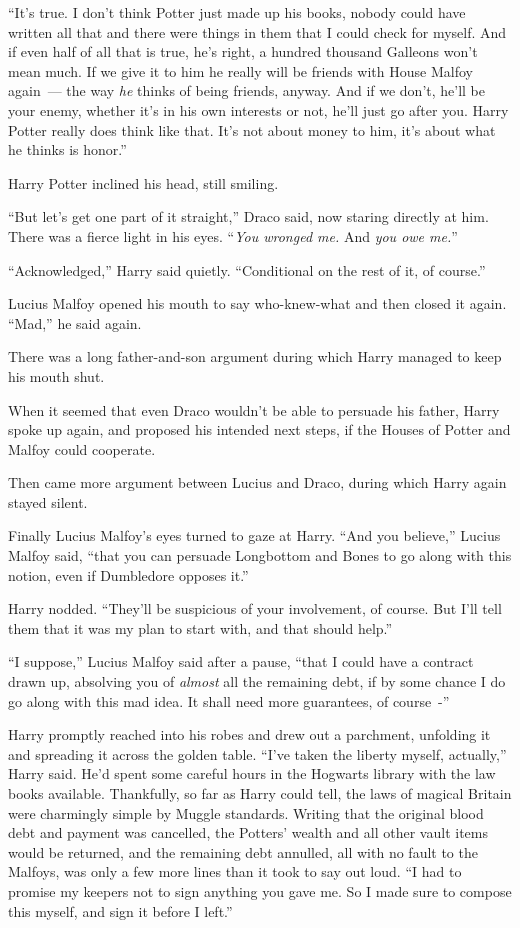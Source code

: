 ``It's true. I don't think Potter just made up his books, nobody could have written all that and there were things in them that I could check for myself. And if even half of all that is true, he's right, a hundred thousand Galleons won't mean much. If we give it to him he really will be friends with House Malfoy again~--- the way \emph{he} thinks of being friends, anyway. And if we don't, he'll be your enemy, whether it's in his own interests or not, he'll just go after you. Harry Potter really does think like that. It's not about money to him, it's about what he thinks is honor.''

Harry Potter inclined his head, still smiling.

``But let's get one part of it straight,'' Draco said, now staring directly at him. There was a fierce light in his eyes. ``\emph{You wronged me.} And \emph{you owe me.}''

``Acknowledged,'' Harry said quietly. ``Conditional on the rest of it, of course.''

Lucius Malfoy opened his mouth to say who-knew-what and then closed it again. ``Mad,'' he said again.

There was a long father-and-son argument during which Harry managed to keep his mouth shut.

When it seemed that even Draco wouldn't be able to persuade his father, Harry spoke up again, and proposed his intended next steps, if the Houses of Potter and Malfoy could cooperate.

Then came more argument between Lucius and Draco, during which Harry again stayed silent.

Finally Lucius Malfoy's eyes turned to gaze at Harry. ``And you believe,'' Lucius Malfoy said, ``that you can persuade Longbottom and Bones to go along with this notion, even if Dumbledore opposes it.''

Harry nodded. ``They'll be suspicious of your involvement, of course. But I'll tell them that it was my plan to start with, and that should help.''

``I suppose,'' Lucius Malfoy said after a pause, ``that I could have a contract drawn up, absolving you of \emph{almost} all the remaining debt, if by some chance I do go along with this mad idea. It shall need more guarantees, of course~-''

Harry promptly reached into his robes and drew out a parchment, unfolding it and spreading it across the golden table. ``I've taken the liberty myself, actually,'' Harry said. He'd spent some careful hours in the Hogwarts library with the law books available. Thankfully, so far as Harry could tell, the laws of magical Britain were charmingly simple by Muggle standards. Writing that the original blood debt and payment was cancelled, the Potters' wealth and all other vault items would be returned, and the remaining debt annulled, all with no fault to the Malfoys, was only a few more lines than it took to say out loud. ``I had to promise my keepers not to sign anything you gave me. So I made sure to compose this myself, and sign it before I left.''

